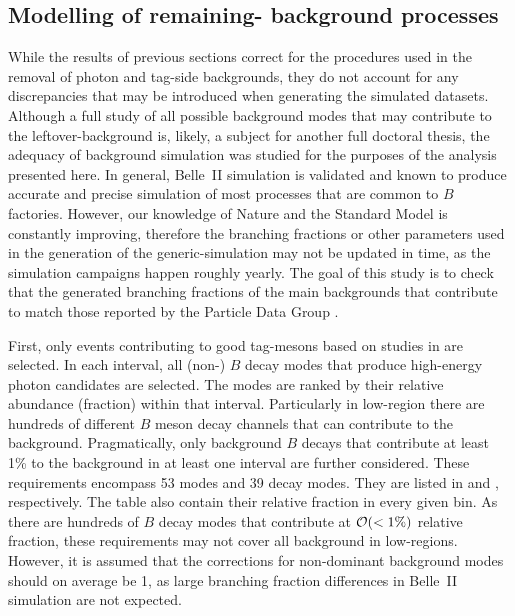 \subsection{Modelling of remaining-\texorpdfstring{\BB}{BB} background processes}

While the results of previous sections correct for the procedures used in the removal of photon and tag-side backgrounds, they do not account for any discrepancies that may be introduced when generating the simulated datasets.
Although a full study of all possible background modes that may contribute to the leftover-\BB background is, likely, a subject for another full doctoral thesis, the adequacy of background simulation was studied for the purposes of the analysis presented here.
In general, Belle~II simulation is validated and known to produce accurate and precise simulation of most processes that are common to $B$ factories.
However, our knowledge of Nature and the Standard Model is constantly improving, therefore the branching fractions or other parameters used in the generation of the generic-\BB simulation may not be updated in time, as the simulation campaigns happen roughly yearly.
The goal of this study is to check that the generated branching fractions of the main backgrounds that contribute to \BtoXsgamma match those reported by the Particle Data Group \cite{Workman:2022ynf}.

First, only events contributing to good tag-\B mesons based on studies in  are selected.
In each \EB interval, all (non-\BtoXsgamma) $B$ decay modes that produce high-energy photon candidates are selected.
The modes are ranked by their relative abundance (fraction) within that \EB interval.
Particularly in low-\EB region there are hundreds of different $B$ meson decay channels that can contribute to the background.
Pragmatically, only background $B$ decays that contribute at least 1\% to the background in at least one \EB interval are further considered.
These requirements encompass 53 \Bp modes and 39 \Bz decay modes. 
They are listed in  and , respectively.
The table also contain their relative fraction in every given bin.
As there are hundreds of $B$ decay modes that contribute at ${\cal O}(<1\%)$ relative fraction, these requirements may not cover all background in low-\EB regions. 
However, it is assumed that the corrections for non-dominant background modes should on average be 1, as large branching fraction differences in Belle~II simulation are not expected.

